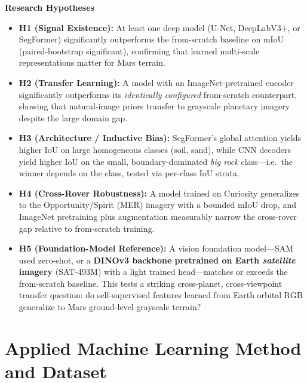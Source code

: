 \documentclass[11pt]{article}
\newcommand{\hdr}[1]{\medskip\noindent\textbf{#1}\par\nopagebreak}
\begin{document}
\hdr{Research Hypotheses}
\begin{itemize}
  \item \textbf{H1 (Signal Existence):} At least one deep model (U-Net, DeepLabV3+, or SegFormer)
  significantly outperforms the from-scratch baseline on mIoU (paired-bootstrap significant),
  confirming that learned multi-scale representations matter for Mars terrain.
  \item \textbf{H2 (Transfer Learning):} A model with an ImageNet-pretrained encoder significantly
  outperforms its \emph{identically configured} from-scratch counterpart, showing that natural-image
  priors transfer to grayscale planetary imagery despite the large domain gap.
  \item \textbf{H3 (Architecture / Inductive Bias):} SegFormer's global attention yields higher IoU
  on large homogeneous classes (soil, sand), while CNN decoders yield higher IoU on the small,
  boundary-dominated \emph{big rock} class---i.e.\ the winner depends on the class, tested via
  per-class IoU strata.
  \item \textbf{H4 (Cross-Rover Robustness):} A model trained on Curiosity generalizes to the
  Opportunity/Spirit (MER) imagery with a bounded mIoU drop, and ImageNet pretraining plus
  augmentation measurably narrow the cross-rover gap relative to from-scratch training.
  \item \textbf{H5 (Foundation-Model Reference):} A vision foundation model---SAM used zero-shot, or a
  \textbf{DINOv3 backbone pretrained on Earth \emph{satellite} imagery} (SAT-493M) with a light
  trained head---matches or exceeds the from-scratch baseline. This tests a striking cross-planet,
  cross-viewpoint transfer question: do self-supervised features learned from Earth orbital RGB
  generalize to Mars ground-level grayscale terrain?
\end{itemize}

\section{Applied Machine Learning Method and Dataset}
\end{document}
